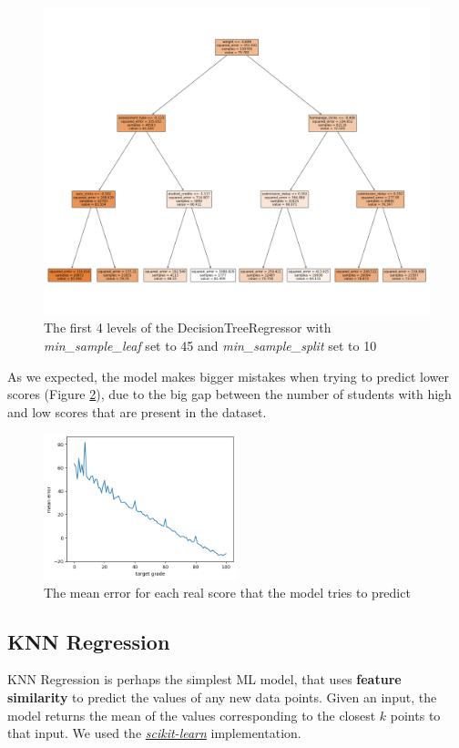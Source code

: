 \documentclass{article}
\begin{document}
\begin{figure}
\centering
\includegraphics[width=1.0\textwidth]{DTstructure.png}
\caption{\label{fig:dtstruct}The first 4 levels of the DecisionTreeRegressor with \textit{min\_sample\_leaf} set to 45 and \textit{min\_sample\_split} set to 10}
\end{figure}

As we expected, the model makes bigger mistakes when trying to predict lower scores (Figure \ref{fig:dtperf}), due to the big gap between the number of students with high and low scores that are present in the dataset. 

\begin{figure}
\centering
\includegraphics[width=0.5\textwidth]{DTnew.png}
\caption{\label{fig:dtperf}The mean error for each real score that the model tries to predict}
\end{figure}


\subsection{KNN Regression}
KNN Regression is perhaps the simplest ML model, that uses \textbf{feature similarity} to predict the values of any new data points. 
Given an input, the model returns the mean of the values corresponding to the closest $k$ points to that input.
We used the \textit{\href{https://scikit-learn.org/stable/modules/generated/sklearn.neighbors.KNeighborsClassifier.html}{scikit-learn}} implementation.
\end{document}
